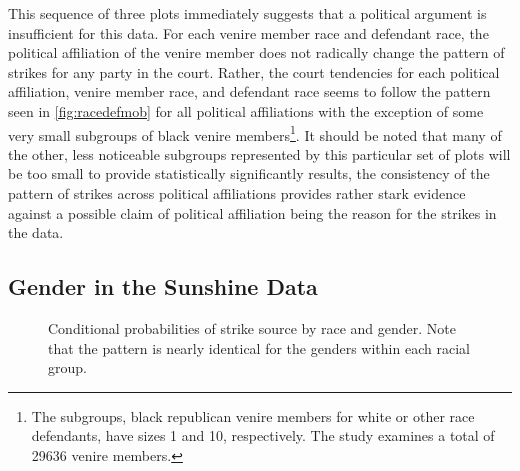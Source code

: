 This sequence of three plots immediately suggests that a political argument is insufficient for this data. For each venire member
race and defendant race, the political affiliation of the venire member does not radically change the pattern of strikes for any
party in the court. Rather, the court tendencies for each political affiliation, venire member race, and defendant race seems to
follow the pattern seen in \ref{fig:racedefmob} for all political affiliations with the exception of some very small subgroups of
black venire members\footnote{The subgroups, black republican venire members for white or other race defendants, have sizes 1 and
  10, respectively. The study examines a total of 29636 venire members.}. It should be noted that many of the other, less
noticeable subgroups represented by this particular set of plots will be too small to provide statistically significantly results,
the consistency of the pattern of strikes across political affiliations provides rather stark evidence against a possible claim of
political affiliation being the reason for the strikes in the data.

\subsection{Gender in the Sunshine Data}

\begin{figure}[h!]
  \centering
  \caption[Strike Source by Race and Gender (Sunshine)]
  {\footnotesize Conditional probabilities of strike source by race and gender. Note that the pattern is nearly identical for the genders within
    each racial group.} \label{fig:racegenpol}
\end{figure}

